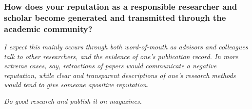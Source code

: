 \documentclass{beamer}
\begin{document}
%
%
%
%
%

\begin{frame} %

\frametitle{How does your reputation as a responsible researcher and scholar become generated and transmitted through the academic community?}

\medskip

{\it I expect this mainly occurs through both word-of-mouth as advisors and colleagues talk to other researchers,  and the evidence of one’s publication record.  In more extreme cases, say, retractions of papers would communicate a negative reputation, while clear and transparent descriptions of one’s research methods would tend to give someone apositive reputation.}


\medskip

{\it Do good research and publish it on magazines.}


\medskip



\end{frame}
\end{document}
